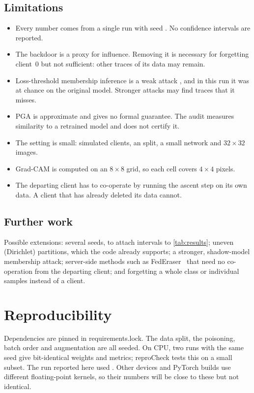 \documentclass[11pt,a4paper]{article}
\newcommand{\code}[1]{{\ttfamily\color{HeadingNavy}#1}}
\begin{document}
\subsection{Limitations}
\begin{itemize}
  \item Every number comes from a single run with seed \Seed{}.
        No confidence intervals are reported.
  \item The backdoor is a proxy for influence. Removing it is necessary for
        forgetting client~0 but not sufficient: other traces of its data may
        remain.
  \item Loss-threshold membership inference is a weak attack\ifMiaInformative
        \else, and in this run it was at chance on the original model\fi.
        Stronger attacks may find traces that it misses.
  \item PGA is approximate and gives no formal guarantee. The audit measures
        similarity to a retrained model and does not certify it.
  \item The setting is small: \NumClients{} simulated clients, an
        \Partition{} split, a small network and $32\times32$ images.
  \item Grad-CAM is computed on an $8\times8$ grid, so each cell covers
        $4\times4$ pixels.
  \item The departing client has to co-operate by running the ascent step on
        its own data. A client that has already deleted its data cannot.
\end{itemize}

\subsection{Further work}
Possible extensions: several seeds, to attach intervals to
\cref{tab:results}; uneven (Dirichlet) partitions, which the code already
supports; a stronger, shadow-model membership attack; server-side methods such
as FedEraser~\cite{liu2021federaser} that need no co-operation from the
departing client; and forgetting a whole class or individual samples instead of
a client.

\section{Reproducibility}
\label{sec:repro}
Dependencies are pinned in \code{requirements.lock}. The data split, the
poisoning, batch order and augmentation are all seeded. On CPU, two runs with
the same seed give bit-identical weights and metrics; \code{reproCheck} tests
this on a small subset. The run reported here used \code{\DeviceName}. Other
devices and PyTorch builds use different floating-point kernels, so their
numbers will be close to these but not identical.
\end{document}
